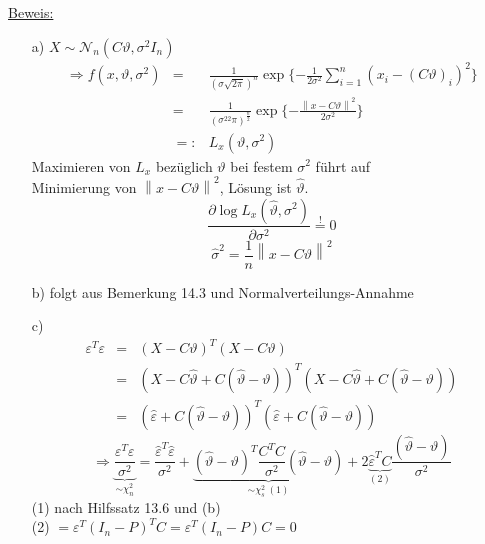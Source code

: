 \documentclass[a4paper,11pt,twoside,titlepage]{article}
\newcommand\NN{ \mathcal{N} } %
\begin{document}
\underline{Beweis:}
\begin{itemize}
\item[a) ]$X\sim\NN_n(C\vartheta,\sigma^2I_n)$
\begin{eqnarray*}
\Rightarrow f(x,\vartheta,\sigma^2)&=&\frac{1}{(\sigma\sqrt{2\pi})^n}\exp\{-\frac{1}{2\sigma^2}\sum_{i=1}^n(x_i-(C\vartheta)_i)^2\}\\
&=&\frac{1}{(\sigma^22\pi)^{\frac{n}{2}}}\exp\{-\frac{\left\|x-C\vartheta\right\|^2}{2\sigma^2}\}\\&=:&L_x(\vartheta,\sigma^2)
\end{eqnarray*}
Maximieren von $L_x$ bezüglich $\vartheta$ bei festem $\sigma^2$ führt auf\\
Minimierung von $\left\|x-C\vartheta\right\|^2$,
 Lösung ist $\hat\vartheta$.
$$\frac{\partial\log L_x(\hat\vartheta,\sigma^2)}{\partial\sigma^2}\stackrel{!}{=}0$$
$$\hat\sigma^2=\frac1n\left\|x-C\hat\vartheta\right\|^2$$
 \item[b) ]folgt aus Bemerkung 14.3 und Normalverteilungs-Annahme
 \item[c) ] \begin{eqnarray*}\varepsilon^T\varepsilon&=&(X-C\vartheta)^T(X-C\vartheta)\\&=&(X-C\hat\vartheta+C(\hat\vartheta-\vartheta))^T
(X-C\hat\vartheta+C(\hat\vartheta-\vartheta))\\&=&(\hat\varepsilon+C(\hat\vartheta-\vartheta))^T(\hat\varepsilon+C(\hat\vartheta-\vartheta))\end{eqnarray*}
\[\Rightarrow\underbrace{\frac{\varepsilon^T\varepsilon}{\sigma^2}}_{\sim\chi^2_n}=
\frac{\hat\varepsilon^T\hat\varepsilon}{\sigma^2}+\underbrace{(
 \hat\vartheta-\vartheta)^T\frac{C^TC}{\sigma^2}(\hat\vartheta-\vartheta)}_{\sim\chi_s^2\ (1)}+2\underbrace{\hat\varepsilon^TC}_{(2)}\frac{(\hat\vartheta-\vartheta)}{\sigma^2}\]
(1) nach Hilfssatz 13.6 und (b)\\
(2) $=\varepsilon^T(I_n-P)^TC=\varepsilon^T(I_n-P)C=0$


\end{itemize}
\end{document}
